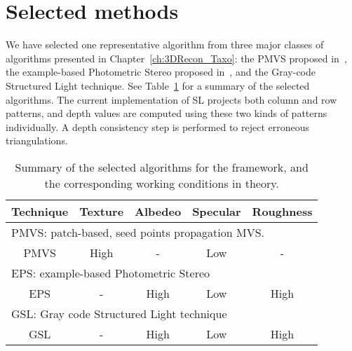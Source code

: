 \section{Selected methods}
We have selected one representative algorithm from three major classes of algorithms presented in Chapter~\ref{ch:3DRecon_Taxo}: the PMVS proposed in~\cite{furukawa2010accurate}, the example-based Photometric Stereo proposed in~\cite{hertzmann2005example}, and the Gray-code Structured Light technique. See Table~\ref{tab:selected_algos} for a summary of the selected algorithms. The current implementation of SL projects both column and row patterns, and depth values are computed using these two kinds of patterns individually. A depth consistency step is performed to reject erroneous triangulations.
\begin{table}[!htbp]
\centering
\begin{tabular}{c|c|c|c|c}
\toprule
Technique & Texture & Albedeo & Specular & Roughness\\
\midrule
\multicolumn{5}{l}{PMVS: patch-based, seed points propagation MVS.}\\
\midrule
PMVS & High & - & Low & -\\
\midrule
\multicolumn{5}{l}{EPS: example-based Photometric Stereo}\\
\midrule
EPS & - & High & Low & High \\
\midrule
\multicolumn{5}{l}{GSL: Gray code Structured Light technique}\\
\midrule
GSL & - & High & Low & High\\
\bottomrule
\end{tabular}
\caption{Summary of the selected algorithms for the framework, and the corresponding working conditions in theory.}
\label{tab:selected_algos}
\end{table}

